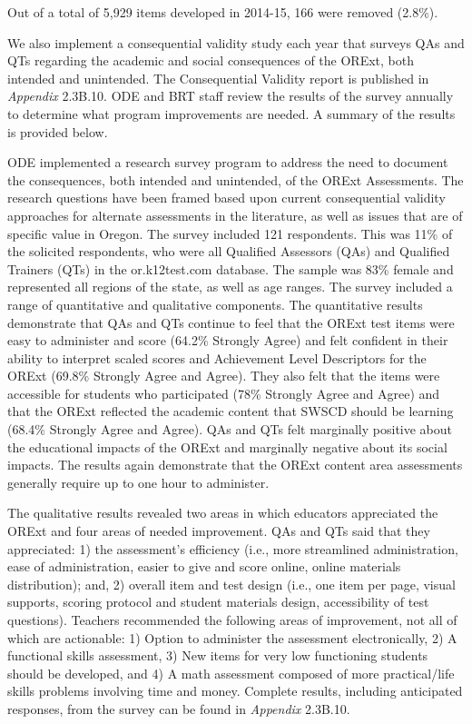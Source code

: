 \documentclass[]{article}
\begin{document}
Out of a total of 5,929 items developed in 2014-15, 166 were removed
(2.8\%).

We also implement a consequential validity study each year that surveys
QAs and QTs regarding the academic and social consequences of the ORExt,
both intended and unintended. The Consequential Validity report is
published in \emph{Appendix} 2.3B.10. ODE and BRT staff review the
results of the survey annually to determine what program improvements
are needed. A summary of the results is provided below.

ODE implemented a research survey program to address the need to
document the consequences, both intended and unintended, of the ORExt
Assessments. The research questions have been framed based upon current
consequential validity approaches for alternate assessments in the
literature, as well as issues that are of specific value in Oregon. The
survey included 121 respondents. This was 11\% of the solicited
respondents, who were all Qualified Assessors (QAs) and Qualified
Trainers (QTs) in the or.k12test.com database. The sample was 83\%
female and represented all regions of the state, as well as age ranges.
The survey included a range of quantitative and qualitative components.
The quantitative results demonstrate that QAs and QTs continue to feel
that the ORExt test items were easy to administer and score (64.2\%
Strongly Agree) and felt confident in their ability to interpret scaled
scores and Achievement Level Descriptors for the ORExt (69.8\% Strongly
Agree and Agree). They also felt that the items were accessible for
students who participated (78\% Strongly Agree and Agree) and that the
ORExt reflected the academic content that SWSCD should be learning
(68.4\% Strongly Agree and Agree). QAs and QTs felt marginally positive
about the educational impacts of the ORExt and marginally negative about
its social impacts. The results again demonstrate that the ORExt content
area assessments generally require up to one hour to administer.

The qualitative results revealed two areas in which educators
appreciated the ORExt and four areas of needed improvement. QAs and QTs
said that they appreciated: 1) the assessment's efficiency (i.e., more
streamlined administration, ease of administration, easier to give and
score online, online materials distribution); and, 2) overall item and
test design (i.e., one item per page, visual supports, scoring protocol
and student materials design, accessibility of test questions). Teachers
recommended the following areas of improvement, not all of which are
actionable: 1) Option to administer the assessment electronically, 2) A
functional skills assessment, 3) New items for very low functioning
students should be developed, and 4) A math assessment composed of more
practical/life skills problems involving time and money. Complete
results, including anticipated responses, from the survey can be found
in \emph{Appendix} 2.3B.10.
\end{document}
